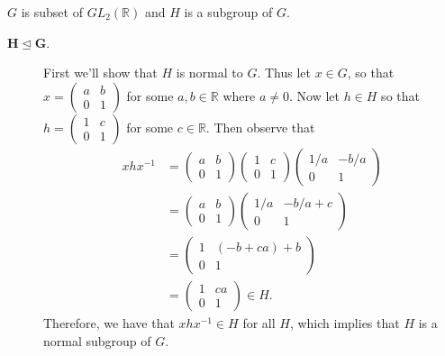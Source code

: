 \documentclass[12pt,letterpaper]{algebra_book}
\newcommand{\normal}{\unlhd}
\theoremstyle{definition}
\begin{document}
    $G$ is subset of $GL_2(\mathbb{R})$ and $H$ is a subgroup of $G$.
    \begin{description}
        \item[$\bm{H \normal G}$.] First we'll show that $H$ is normal
        to $G$. Thus let $x \in G$, so that 
        $
            x =         \begin{pmatrix}
                a & b \\
                0 & 1    
            \end{pmatrix}
        $
        for some $a, b \in \mathbb{R}$ where $a \ne 0$. Now let $h \in
        H$ so that 
        $
            h = \begin{pmatrix}
                1 & c \\
                0 & 1    
            \end{pmatrix}
        $
        for some $c \in \mathbb{R}$. Then observe that 
        \begin{align*}
            xhx^{-1} &= 
            \begin{pmatrix}
                a & b \\
                0 & 1    
            \end{pmatrix}
            \begin{pmatrix}
                1 & c \\
                0 & 1    
            \end{pmatrix}
            \begin{pmatrix}
                1/a & -b/a \\
                0 & 1    
            \end{pmatrix}\\
            &= \begin{pmatrix}
                a & b \\
                0 & 1    
            \end{pmatrix}
            \begin{pmatrix}
                1/a & -b/a + c \\
                0 & 1    
            \end{pmatrix}\\
            &=
            \begin{pmatrix}
                1 & (-b + ca) + b \\
                0 & 1    
            \end{pmatrix}\\
            &= \begin{pmatrix}
                1 & ca \\
                0 & 1    
            \end{pmatrix} \in H.
        \end{align*}
    Therefore, we have that $xhx^{-1} \in H$ for all $H$, which
    implies that $H$ is a normal subgroup of $G$. 


\end{description}
\end{document}
